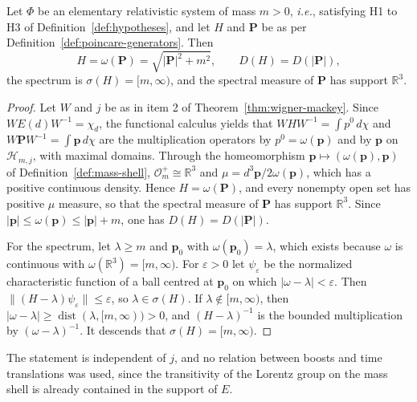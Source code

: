 \begin{corollary}\label{thm:relativistic-hamiltonian}
	Let $\Phi$ be an elementary relativistic system of mass $m>0$, \textit{i.e.}, satisfying H1 to H3 of Definition~\ref{def:hypotheses}, and let $H$ and $\mathbf{P}$ be as per Definition~\ref{def:poincare-generators}. Then
	\begin{equation}\label{eq:relativistic-hamiltonian}
		H=\omega(\mathbf{P})=\sqrt{|\mathbf{P}|^2+m^2},\qquad D(H)=D(|\mathbf{P}|),
	\end{equation}
	the spectrum is $\sigma(H)=[m,\infty)$, and the spectral measure of $\mathbf{P}$ has support $\mathbb{R}^3$.
\end{corollary}

\begin{proof}
	Let $W$ and $j$ be as in item 2 of Theorem~\ref{thm:wigner-mackey}. Since $W E(d)W^{-1}=\chi_d$, the functional calculus yields that $WHW^{-1}=\int p^0\,d\chi$ and $W\mathbf{P}W^{-1}=\int\mathbf{p}\,d\chi$ are the multiplication operators by $p^0=\omega(\mathbf{p})$ and by $\mathbf{p}$ on $\mathcal{H}_{m,j}$, with maximal domains. Through the homeomorphism $\mathbf{p}\mapsto(\omega(\mathbf{p}),\mathbf{p})$ of Definition~\ref{def:mass-shell}, $\mathcal{O}_m^+\cong\mathbb{R}^3$ and $\mu=d^3\mathbf{p}/2\omega(\mathbf{p})$, which has a positive continuous density. Hence $H=\omega(\mathbf{P})$, and every nonempty open set has positive $\mu$ measure, so that the spectral measure of $\mathbf{P}$ has support $\mathbb{R}^3$. Since $|\mathbf{p}|\leq\omega(\mathbf{p})\leq|\mathbf{p}|+m$, one has $D(H)=D(|\mathbf{P}|)$.
	
	For the spectrum, let $\lambda\geq m$ and $\mathbf{p}_0$ with $\omega(\mathbf{p}_0)=\lambda$, which exists because $\omega$ is continuous with $\omega(\mathbb{R}^3)=[m,\infty)$. For $\varepsilon>0$ let $\psi_\varepsilon$ be the normalized characteristic function of a ball centred at $\mathbf{p}_0$ on which $|\omega-\lambda|<\varepsilon$. Then $\|(H-\lambda)\psi_\varepsilon\|\leq\varepsilon$, so $\lambda\in\sigma(H)$. If $\lambda\notin[m,\infty)$, then $|\omega-\lambda|\geq\operatorname{dist}(\lambda,[m,\infty))>0$, and $(H-\lambda)^{-1}$ is the bounded multiplication by $(\omega-\lambda)^{-1}$. It descends that $\sigma(H)=[m,\infty)$.
\end{proof}

\noindent The statement is independent of $j$, and no relation between boosts and time translations was used, since the transitivity of the Lorentz group on the mass shell is already contained in the support of $E$.

